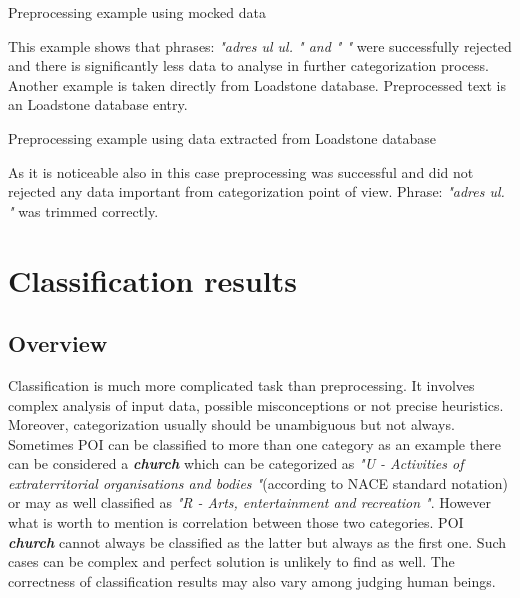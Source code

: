 \begin{algorithm}
	
	\hfill \break
	\caption{Preprocessing example using mocked data}
	\label{alg:1st}
\end{algorithm}

This example shows that phrases: \textit{"adres ul ul. " and " "} were successfully rejected and there is significantly less data to analyse in further categorization process.
\newline
Another example is taken directly from Loadstone database. Preprocessed text is an Loadstone database entry.
\begin{algorithm}
	
	\hfill \break
	\caption{Preprocessing example using data extracted from Loadstone database}
	\label{alg:2nd}
\end{algorithm}
\newline
As it is noticeable also in this case preprocessing was successful and did not rejected any data important from categorization point of view. Phrase: \textit{"adres ul. "} was trimmed correctly.
 
  
\section{Classification results}
\label{classification_results}
\subsection{Overview}
Classification is much more complicated task than preprocessing. It involves complex analysis of input data, possible misconceptions or not precise heuristics. Moreover, categorization usually should be unambiguous but not always. Sometimes POI can be classified to more than one category as an example there can be considered a \textit{\textbf{church}} which can be categorized as \textit{"U - Activities of extraterritorial organisations and bodies "}(according to NACE standard notation) or may as well classified as \textit{"R - Arts, entertainment and recreation "}. However what is worth to mention is correlation between those two categories. POI \textit{\textbf{church}} cannot always be classified as the latter but always as the first one. Such cases can be complex and perfect solution is unlikely to find as well. The correctness of classification results may also vary among judging human beings.

